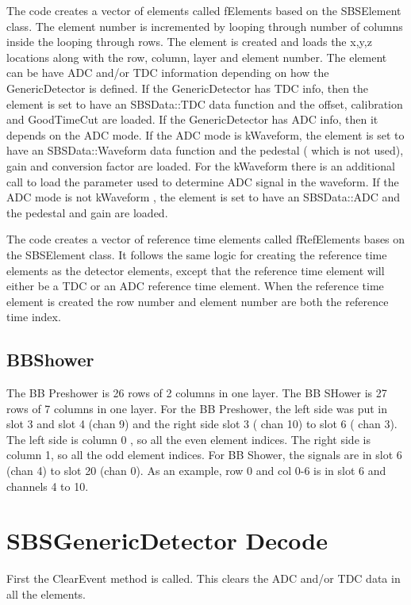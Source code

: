 \documentclass[11pt]{article}
\begin{document}
The code creates a vector of elements called fElements based on the SBSElement class.
The element number is incremented
by looping through  number of columns inside the looping through rows.
The element is created and loads the x,y,z locations along with the row, column, layer and element number.
The element can be have ADC and/or TDC information depending on how the GenericDetector is defined.
If the GenericDetector has TDC info, then the element is set to have an SBSData::TDC data function and
 the offset, calibration and GoodTimeCut are loaded.
If the GenericDetector has ADC info, then it depends on the ADC mode.
If the ADC mode is kWaveform, the element is set to have an SBSData::Waveform data function and
the pedestal ( which is not used), gain and conversion factor are loaded. For the kWaveform
there is an additional call to load the parameter used to determine ADC signal in the waveform.
If the ADC mode is not kWaveform , the element is set to have an SBSData::ADC and the
pedestal and gain are loaded.
   

The code creates a vector of reference time elements called fRefElements bases on the SBSElement class.
It follows the same logic for creating the reference time elements as the detector elements, 
except that the reference time element will either be a TDC or an ADC reference time element.
When the reference time element is created the row number and element number are both
 the reference time index.
 
 



\subsection{BBShower}
The BB Preshower is 26 rows of 2 columns in one layer.  The BB SHower is 27 rows of 7 columns in one 
layer.
 For the BB Preshower, the left side was put in slot 3 and slot 4 (chan 9)  and the right side slot 3 ( chan 10)
 to slot 6 ( chan 3). The left side is column 0 , so all the even element indices. The right side is 
 column 1, so all the odd element indices. 
 For BB Shower, the signals are in slot 6 (chan 4) to slot 20 (chan 0). As an example, row 0 and col 0-6
 is in slot 6 and channels 4 to 10.


\section{SBSGenericDetector Decode}

First the ClearEvent method is called. This clears the ADC and/or  TDC data  in all the elements.
\end{document}
